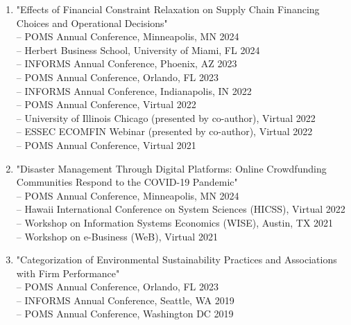 \documentclass[margin,line]{resume}
\begin{document}
\begin{resume}
\begin{enumerate}[topsep=0pt, leftmargin=*]
  	     \item "Effects of Financial Constraint Relaxation on Supply Chain Financing Choices and Operational Decisions"\\[0.3em]
        -- POMS Annual Conference, Minneapolis, MN \hfill   2024\\
        -- Herbert Business School, University of Miami, FL \hfill 2024\\ 
  	    -- INFORMS Annual Conference, Phoenix, AZ \hfill 2023\\ 
        -- POMS Annual Conference, Orlando, FL \hfill   2023\\
  	     -- INFORMS Annual Conference, Indianapolis, IN \hfill  2022\\
  	     -- POMS Annual Conference, Virtual \hfill2022\\
  	     -- University of Illinois Chicago (presented by co-author), Virtual \hfill 2022\\
 	           -- ESSEC ECOMFIN Webinar (presented by co-author), Virtual \hfill 2022\\
 	           -- POMS Annual Conference, Virtual \hfill2021\\

 	     \item "Disaster Management Through Digital Platforms: Online Crowdfunding Communities Respond to the COVID-19 Pandemic"\\[0.3em]
 	         -- POMS Annual Conference, Minneapolis, MN \hfill   2024\\
             -- Hawaii International Conference on System Sciences (HICSS), Virtual \hfill 2022\\
 	           -- Workshop on Information Systems Economics (WISE), Austin, TX \hfill 2021\\
 	           -- Workshop on e-Business (WeB), Virtual \hfill 2021\\
              
 	     \item "Categorization of Environmental Sustainability Practices and Associations with Firm Performance"\\[0.3em]
  	     -- POMS Annual Conference, Orlando, FL \hfill   2023\\
 	           -- INFORMS Annual Conference, Seattle, WA \hfill2019\\
 	           -- POMS Annual Conference, Washington DC \hfill2019

 	           

 	  \end{enumerate}


\end{resume}
\end{document}

